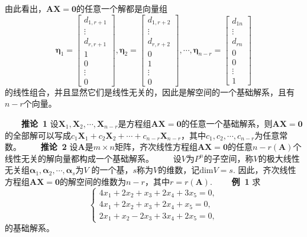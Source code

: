 \documentclass[compress,mathserif,cjk]{beamer}
\theoremstyle{remark}
\numberwithin{equation}{section}
\newcommand{\hei}{\bf}      %
\begin{document}
\begin{CJK}{UTF8}{gbsn}
\begin{frame}
 由此看出，$\bm{AX}=\bm0$的任意一个解都是向量组
 $$\bm\eta_1=\left[\begin{matrix}d_{1,r+1}\\\vdots\\d_{r,r+1}\\1\\0\\\vdots\\0\end{matrix}\right],
 \bm\eta_2=\left[\begin{matrix}d_{1,r+2}\\\vdots\\d_{r,r+2}\\0\\1\\\vdots\\0\end{matrix}\right],\cdots,
 \bm\eta_{n-r}=\left[\begin{matrix}d_{1n}\\\vdots\\d_{rn}\\0\\0\\\vdots\\1\end{matrix}\right]$$
 的线性组合，并且显然它们是线性无关的，因此是解空间的一个基础解系，且有$n-r$个向量。
\end{frame}

\begin{frame}
\ \ \ \ {\hei 推论~1} 设$\bm X_1,\bm X_2,\cdots,\bm X_{n-r}$是方程组$\bm{AX}=\bm0$的任意一个基础解系，则$\bm{AX}=\bm0$的全部解可以写成$c_1\bm X_1+c_2\bm X_2+\cdots+c_{n-r}\bm X_{n-r}$，其中$c_1,c_2,\cdots,c_{n-r}$为任意常数。
\pause\vskip 10pt
\ \ \ \ {\hei 推论~2} 设$\bm A$是$m\times n$矩阵，齐次线性方程组$\bm{AX}=\bm0$的任意$n-r(\bm A)$个线性无关的解向量都构成一个基础解系。
\pause\vskip 10pt
\ \ \ \ 设$V$为$P^n$的子空间，称$V$的极大线性无关组$\bm\alpha_1,\bm\alpha_2,\cdots,\bm\alpha_s$为$V$ 的一个基，$s$称为$V$的维数，记dim$V=s$. 因此，齐次线性方程组$\bm{AX}=\bm0$的解空间的维数为$n-r$，其中$r=r(\bm A)$.
\pause\vskip 10pt
\ \ \ \ {\hei 例~1} 求
$$\left\{\begin{array}{r}
4x_1+2x_2+x_3+2x_4+3x_5=0,\\4x_1+2x_2+x_3+2x_4+x_5=0,\\2x_1+x_2-2x_3+3x_4+2x_5=0,
\end{array}\right.$$
的基础解系。
\end{frame}


\end{CJK}
\end{document}
